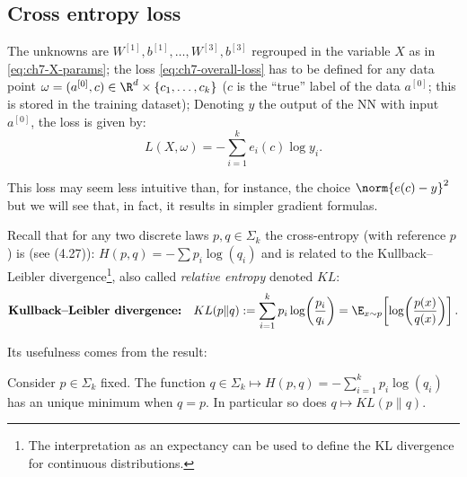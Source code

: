 \subsection{Cross entropy loss}

The unknowns are $W^{[1]}, b^{[1]}, \ldots, W^{[3]}, b^{[3]}$ regrouped in the variable $X$ as in \eqref{eq:ch7-X-params}; the loss \eqref{eq:ch7-overall-loss} has to be defined for any data point $\omega = (a^{[0]}, c) \in \R^d \times \{c_1, \ldots, c_k\}$ ($c$ is the ``true'' label of the data $a^{[0]}$; this is stored in the training dataset); Denoting $y$ the output of the NN with input $a^{[0]}$, the loss is given by:
\begin{equation}\label{eq:ch7-crossentropy-loss}
  L(X, \omega) = -\sum_{i=1}^{k} e_i(c) \log y_i.
\end{equation}

This loss may seem less intuitive than, for instance, the choice $\norm{e(c) - y}^2$ but we will see that, in fact, it results in simpler gradient formulas.

Recall that for any two discrete laws $p, q \in \Sigma_k$ the cross-entropy (with reference $p$) is (see (4.27)): $H(p, q) = -\sum p_i \log(q_i)$ and is related to the Kullback--Leibler divergence\footnote{The interpretation as an expectancy can be used to define the KL divergence for continuous distributions.}, also called \emph{relative entropy} denoted $KL$:
\begin{equation}\label{eq:ch7-KL-def}
  \textbf{Kullback--Leibler divergence:} \quad KL(p \| q) := \sum_{i=1}^{k} p_i \log\!\left( \frac{p_i}{q_i} \right) = \E_{x \sim p}\!\left[ \log\!\left( \frac{p(x)}{q(x)} \right) \right].
\end{equation}

Its usefulness comes from the result:

\begin{lemma}\label{lem:ch7-KL-minimum}
Consider $p \in \Sigma_k$ fixed. The function $q \in \Sigma_k \mapsto H(p, q) = -\sum_{i=1}^{k} p_i \log(q_i)$ has an unique minimum when $q = p$. In particular so does $q \mapsto KL(p \| q)$.
\end{lemma}

